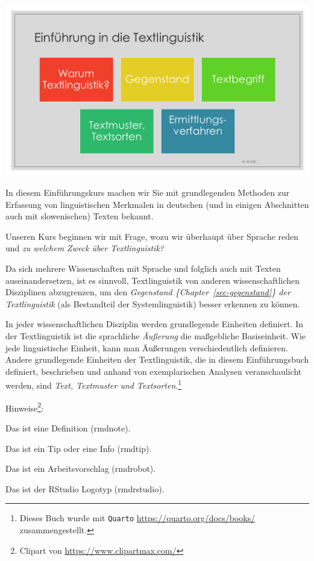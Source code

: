 \documentclass[
  letterpaper,
  DIV=11,
  numbers=noendperiod]{scrreprt}
\begin{document}
\includegraphics[width=1\textwidth,height=\textheight]{./pictures/Diapozitiv5.PNG}

In diesem Einführungskurs machen wir Sie mit grundlegenden Methoden zur
Erfassung von linguistischen Merkmalen in deutschen (und in einigen
Abschnitten auch mit slowenischen) Texten bekannt.

Unseren Kurs beginnen wir mit Frage, wozu wir überhaupt über Sprache
reden und \emph{zu welchem Zweck über Textlinguistik?}

Da sich mehrere Wissenschaften mit Sprache und folglich auch mit Texten
auseinandersetzen, ist es sinnvoll, Textlinguistik von anderen
wissenschaftlichen Disziplinen abzugrenzen, um den \emph{Gegenstand
\{Chapter~\ref{sec-gegenstand}\} der Textlinguistik} (als Bestandteil
der Systemlinguistik) besser erkennen zu können.

In jeder wissenschaftlichen Disziplin werden grundlegende Einheiten
definiert. In der Textlinguistik ist die sprachliche \emph{Äußerung} die
maßgebliche Basiseinheit. Wie jede linguistische Einheit, kann man
Äußerungen verschiedentlich definieren. Andere grundlegende Einheiten
der Textlinguistik, die in diesem Einführungsbuch definiert, beschrieben
und anhand von exemplarischen Analysen veranschaulicht werden, sind
\emph{Text, Textmuster und Textsorten}.\footnote{Dieses Buch wurde mit
  \texttt{Quarto} \url{https://quarto.org/docs/books/} zusammengestellt.}

Hinweise\footnote{Clipart von \url{https://www.clipartmax.com/}}:

Das ist eine Definition (rmdnote).

Das ist ein Tip oder eine Info (rmdtip).

Das ist ein Arbeitsvorschlag (rmdrobot).

Das ist der RStudio Logotyp (rmdrstudio).
\end{document}
